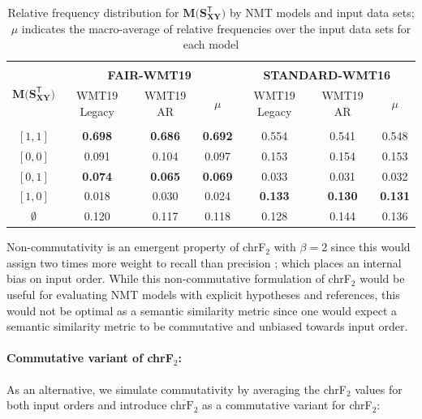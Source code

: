 \documentclass[11pt,a4paper]{article}
\begin{document}
\begin{table}[t!]
  \centering
  \begin{tabular*}{\textwidth}{c @{\extracolsep{\fill}} cccccc}
    \hline \\[-10pt]
    \multirow{2}[3]{*}{$\mathbf{M(S_{XY}^{\mathsf{T}}})$} & \multicolumn{3}{c}{\textbf{FAIR-WMT19}} & \multicolumn{3}{c}{\textbf{STANDARD-WMT16}} \\
    \cmidrule(lr){2-4} \cmidrule(lr){5-7}
                                                          & WMT19 Legacy & WMT19 AR & $\mu$ & WMT19 Legacy & WMT19 AR & $\mu$ \\[3pt]
    \hline \hline \\[-10pt]
    $[1,1]$ & \textbf{0.698} & \textbf{0.686} & \textbf{0.692} & 0.554 & 0.541 & 0.548 \\
    $[0,0]$ & 0.091 & 0.104 & 0.097 & 0.153 & 0.154 & 0.153 \\
    $[0,1]$ & \textbf{0.074} & \textbf{0.065} & \textbf{0.069} & 0.033 & 0.031 & 0.032 \\
    $[1,0]$ & 0.018 & 0.030 & 0.024 & \textbf{0.133} & \textbf{0.130} & \textbf{0.131}\\
    $\emptyset$ & 0.120 & 0.117 & 0.118 & 0.128 & 0.144 & 0.136 \\
    \hline
  \end{tabular*}
  \caption{Relative frequency distribution for $\mathbf{M(S_{XY}^{\mathsf{T}}})$
    by NMT models and input data sets; $\mu$ indicates the macro-average of
    relative frequencies over the input data sets for each model}
  \label{isometry_frequency}
\end{table}

Non-commutativity is an emergent property of chrF$_2$ with $\beta = 2$ since
this would assign two times more weight to recall than precision
\cite{popovic2015chrf}; which places an internal bias on input order. While this
non-commutative formulation of chrF$_2$ would be useful for evaluating NMT
models with explicit hypotheses and references, this would not be optimal as a
semantic similarity metric since one would expect a semantic similarity metric
to be commutative and unbiased towards input order.

\paragraph{Commutative variant of chrF$_2$:} As an alternative, we simulate
commutativity by averaging the chrF$_2$ values for both input orders and
introduce $\overline{\text{chrF}_2}$ as a commutative variant for chrF$_2$:
\end{document}
